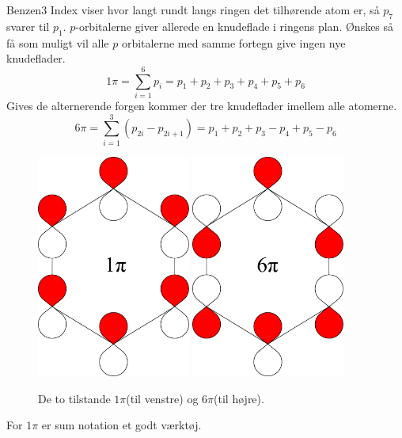 \begin{opgave}{Benzen}{3}
\opg Index viser hvor langt rundt langs ringen det tilhørende atom er, så $p_7$ svarer til $p_1$. 
\opg $p$-orbitalerne giver allerede en knudeflade i ringens plan. Ønskes så få som muligt vil alle $p$ orbitalerne med samme fortegn give ingen nye knudeflader.
$$
1\pi = \sum_{i=1}^6 p_i = p_1+p_2+p_3+p_4+p_5+p_6
$$
\opg
Gives de alternerende forgen kommer der tre knudeflader imellem alle atomerne.
$$
6\pi = \sum_{i=1}^3 (p_{2i}-p_{2i+1})=p_1+p_2+p_3-p_4+p_5-p_6
$$
\begin{figure}
\center
\includegraphics[width = 0.45\textwidth]{Atom-ogMolekylefysik/billeder/benzen1}
\includegraphics[width = 0.45\textwidth]{Atom-ogMolekylefysik/billeder/benzen6}
\caption{De to tilstande $1\pi$(til venstre) og $6\pi$(til højre).}
\end{figure}
\opg For $1\pi$ er sum notation et godt værktøj.
\begin{align*}

\end{align*}
\end{opgave}
